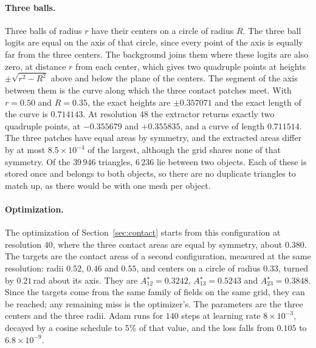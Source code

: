 \documentclass[11pt]{article}
\theoremstyle{definition}
\begin{document}
\paragraph*{Three balls.} Three balls of radius $r$ have their centers on a
circle of radius $R$. The three ball logits are equal on the axis of that
circle, since every point of the axis is equally far from the three centers.
The background joins them where these logits are also zero, at distance $r$
from each center, which gives two quadruple points at heights
$\pm\sqrt{r^2-R^2}$ above and below the plane of the centers. The segment of
the axis between them is the curve along which the three contact patches
meet. With $r = 0.50$ and $R = 0.35$, the exact heights are $\pm0.357071$ and
the exact length of the curve is $0.714143$. At resolution $48$ the extractor
returns exactly two quadruple points, at $-0.355679$ and $+0.355835$, and a
curve of length $0.711514$. The three patches have equal areas by symmetry,
and the extracted areas differ by at most $8.5\times10^{-4}$ of the largest,
although the grid shares none of that symmetry. Of the $39\,946$ triangles,
$6\,236$ lie between two objects. Each of these is stored once and belongs
to both objects, so there are no duplicate triangles to match up, as there
would be with one mesh per object.

\paragraph*{Optimization.} The optimization of Section~\ref{sec:contact}
starts from this configuration at resolution $40$, where the three contact
areas are equal by symmetry, about $0.380$. The targets are the contact areas
of a second configuration, measured at the same resolution: radii $0.52$,
$0.46$ and $0.55$, and centers on a circle of radius $0.33$, turned by
$0.21$\,rad about its axis. They are $A^\star_{12} = 0.3242$,
$A^\star_{13} = 0.5243$ and $A^\star_{23} = 0.3848$. Since the targets come
from the same family of fields on the same grid, they can be reached; any
remaining miss is the optimizer's. The parameters are the three centers
and the three radii. Adam runs for $140$ steps at learning rate
$8\times10^{-3}$, decayed by a cosine schedule to $5\%$ of that value, and
the loss falls from $0.105$ to $6.8\times10^{-9}$.
\end{document}
